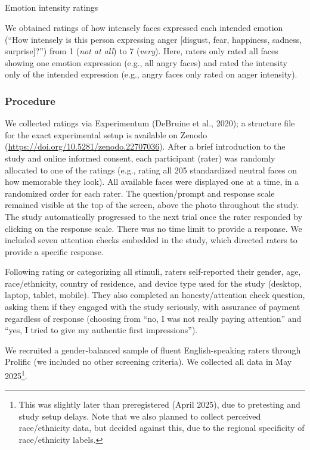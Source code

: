 \documentclass[
  letterpaper,
  DIV=11,
  numbers=noendperiod]{scrartcl}
\makeatletter
\let\oldsubparagraph\subparagraph
\renewcommand{\subparagraph}{
    \@ifstar
      \xxxSubParagraphStar
      \xxxSubParagraphNoStar
  }
\newcommand{\xxxSubParagraphStar}[1]{\oldsubparagraph*{#1}\mbox{}}
\newcommand{\xxxSubParagraphNoStar}[1]{\oldsubparagraph{#1}\mbox{}}
\makeatother
\begin{document}
\subparagraph{Emotion intensity
ratings}\label{emotion-intensity-ratings}

We obtained ratings of how intensely faces expressed each intended
emotion (``How intensely is this person expressing anger {[}disgust,
fear, happiness, sadness, surprise{]}?'') from 1 (\emph{not at all}) to
7 (\emph{very}). Here, raters only rated all faces showing one emotion
expression (e.g., all angry faces) and rated the intensity only of the
intended expression (e.g., angry faces only rated on anger intensity).

\subsubsection{Procedure}\label{procedure-1}

We collected ratings via Experimentum (DeBruine et al., 2020); a
structure file for the exact experimental setup is available on Zenodo
(\url{https://doi.org/10.5281/zenodo.22707036}). After a brief
introduction to the study and online informed consent, each participant
(rater) was randomly allocated to one of the ratings (e.g., rating all
205 standardized neutral faces on how memorable they look). All
available faces were displayed one at a time, in a randomized order for
each rater. The question/prompt and response scale remained visible at
the top of the screen, above the photo throughout the study. The study
automatically progressed to the next trial once the rater responded by
clicking on the response scale. There was no time limit to provide a
response. We included seven attention checks embedded in the study,
which directed raters to provide a specific response.

Following rating or categorizing all stimuli, raters self-reported their
gender, age, race/ethnicity, country of residence, and device type used
for the study (desktop, laptop, tablet, mobile). They also completed an
honesty/attention check question, asking them if they engaged with the
study seriously, with assurance of payment regardless of response
(choosing from ``no, I was not really paying attention'' and ``yes, I
tried to give my authentic first impressions'').

We recruited a gender-balanced sample of fluent English-speaking raters
through Prolific (we included no other screening criteria). We collected
all data in May 2025\footnote{This was slightly later than preregistered
  (April 2025), due to pretesting and study setup delays. Note that we
  also planned to collect perceived race/ethnicity data, but decided
  against this, due to the regional specificity of race/ethnicity
  labels.}.
\end{document}
